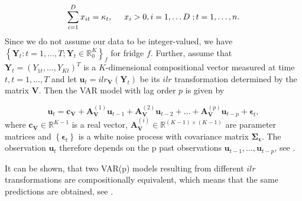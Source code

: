 \begin{equation}
\sum_{i=1}^D x_{it} = \kappa_t, \hspace{0.5cm} x_i > 0, i=1,\ldots D \hspace{0.1cm}; t=1,\ldots, n.
\label{eq:CTS characterisation}
\end{equation} 
%
Since we do not assume our data to be integer-valued, we have $\left\{\bm{Y}_t:t=1,\ldots,T; \bm{Y}_t \in \mathbb{R}_0^K \right\}_f$ for fridge $f$. Further, assume that $\bm{Y}_t=(Y_{1t},\ldots,Y_{Kt})^T$ is a $K$-dimensional compositional vector measured at time $t, t=1,\ldots,T$ and let $\textbf{u}_t = ilr_{\bm{V}}(\bm{Y}_t)$ be its $ilr$ transformation determined by the matrix $\textbf{V}$. Then the VAR model with lag order $p$ is given by

\begin{equation}
\textbf{u}_t = \textbf{c}_{\textbf{V}} + \textbf{A}_{\textbf{V}}^{(1)}\textbf{u}_{t-1} + \textbf{A}_{\textbf{V}}^{(2)}\textbf{u}_{t-2} + \ldots + \textbf{A}_{\textbf{V}}^{(p)}\textbf{u}_{t-p} + \bm{\epsilon}_{t},
\label{eq:VAR model}
\end{equation}
%
where $\textbf{c}_{\textbf{V}} \in \mathbb{R}^{K-1}$ is a real vector, $\textbf{A}_{\textbf{V}}^{(i)} \in \mathbb{R}^{(K-1) \times (K-1)}$ are parameter matrices and $\left\{\bm{\epsilon}_t\right\}$ is a white noise process with covariance matrix $\bm{\Sigma_\epsilon}$. The observation $\textbf{u}_t$ therefore depends on the p past observations $\textbf{u}_{t-1},\ldots,\textbf{u}_{t-p}$, see \textcite{Kynclova:2015}. 

It can be shown, that two VAR(p) models resulting from different $ilr$ transformations are compositionally equivalent, which means that the same predictions are obtained, see \textcite{Kynclova:2015}. 



